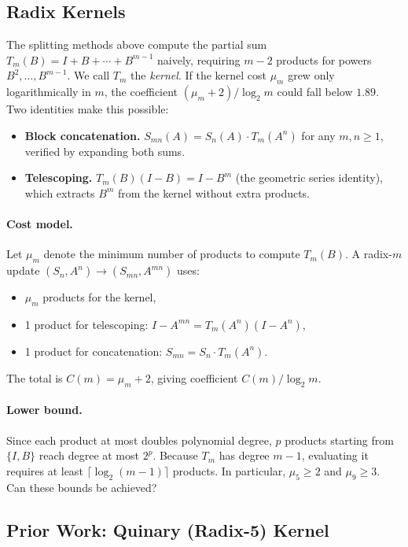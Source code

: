 \documentclass[
  journal=largetwo,
  manuscript=article,
  manuscriptlabel={Research Preprint},
  logo=false,
  simfonts=false,
  year=2026,
  volume=1,
]{cup-journal}
\theoremstyle{definition}
\theoremstyle{remark}
\begin{document}
\subsection{Radix Kernels}

The splitting methods above compute the partial sum
$T_m(B) = I + B + \cdots + B^{m-1}$ naively, requiring $m - 2$ products
for powers $B^2, \ldots, B^{m-1}$.
We call $T_m$ the \emph{kernel}.
If the kernel cost $\mu_m$ grew only logarithmically in $m$, the
coefficient $(\mu_m + 2)/\log_2 m$ could fall below $1.89$.
Two identities make this possible:
\begin{itemize}
  \item \textbf{Block concatenation.}
    $S_{mn}(A) = S_n(A) \cdot T_m(A^n)$ for any $m, n \geq 1$,
    verified by expanding both sums.
  \item \textbf{Telescoping.}
    $T_m(B)(I - B) = I - B^m$\label{eq:telescope}
    (the geometric series identity), which extracts $B^m$ from the
    kernel without extra products.
\end{itemize}

\paragraph{Cost model.}
Let $\mu_m$ denote the minimum number of products to compute $T_m(B)$.
A radix-$m$ update $(S_n, A^n) \to (S_{mn}, A^{mn})$ uses:
\begin{itemize}
  \item $\mu_m$ products for the kernel,
  \item 1 product for telescoping:
    $I - A^{mn} = T_m(A^n)(I - A^n)$,
  \item 1 product for concatenation:
    $S_{mn} = S_n \cdot T_m(A^n)$.
\end{itemize}
The total is $C(m) = \mu_m + 2$, giving coefficient $C(m)/\log_2 m$.

\paragraph{Lower bound.}
Since each product at most doubles polynomial degree, $p$ products
starting from $\{I, B\}$ reach degree at most $2^p$.
Because $T_m$ has degree $m-1$, evaluating it requires at least
$\lceil \log_2(m-1) \rceil$ products.
In particular, $\mu_5 \geq 2$ and $\mu_9 \geq 3$.
Can these bounds be achieved?

\subsection{Prior Work: Quinary (Radix-5) Kernel}
\label{subsec:quinary}
\end{document}
